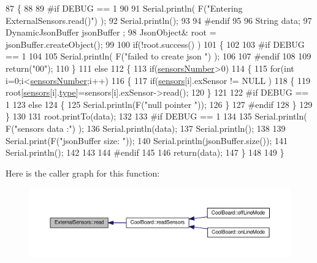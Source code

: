 \begin{DoxyCode}
87 \{
88 
89 \textcolor{preprocessor}{#if DEBUG == 1}
90 
91     Serial.println( F(\textcolor{stringliteral}{"Entering ExternalSensors.read()"}) );
92     Serial.println();
93 
94 \textcolor{preprocessor}{#endif }
95 
96     String data;
97     DynamicJsonBuffer  jsonBuffer ;
98     JsonObject& root = jsonBuffer.createObject();
99 
100     \textcolor{keywordflow}{if}(!root.success() )
101     \{
102  
103 \textcolor{preprocessor}{    #if DEBUG == 1}
104 
105         Serial.println( F(\textcolor{stringliteral}{"failed to create json "}) );
106     
107 \textcolor{preprocessor}{    #endif }
108 
109         \textcolor{keywordflow}{return}(\textcolor{stringliteral}{"00"});
110     \}
111     \textcolor{keywordflow}{else}
112     \{
113         \textcolor{keywordflow}{if}(\hyperlink{classExternalSensors_a58e4fbf9adeae787d92be5fa33043b5d}{sensorsNumber}>0)
114         \{
115             \textcolor{keywordflow}{for}(\textcolor{keywordtype}{int} i=0;i<\hyperlink{classExternalSensors_a58e4fbf9adeae787d92be5fa33043b5d}{sensorsNumber};i++)
116             \{
117                 \textcolor{keywordflow}{if}(\hyperlink{classExternalSensors_a284233f884fcf00154a44740cf1d9e1e}{sensors}[i].exSensor != NULL )
118                 \{
119                     root[\hyperlink{classExternalSensors_a284233f884fcf00154a44740cf1d9e1e}{sensors}[i].\hyperlink{structExternalSensors_1_1sensor_a6acfdb02c742c2110d7bd2b5d9fce9e7}{type}]=sensors[i].exSensor->read();       
120                 \}
121             
122 \textcolor{preprocessor}{            #if DEBUG == 1}
123                 \textcolor{keywordflow}{else}
124                 \{
125                     Serial.println(F(\textcolor{stringliteral}{"null pointer "}));
126                 \}
127 \textcolor{preprocessor}{            #endif  }
128             \}
129         \}   
130         
131         root.printTo(data);
132     
133 \textcolor{preprocessor}{    #if DEBUG == 1}
134 
135         Serial.println( F(\textcolor{stringliteral}{"sensors data :"}) );
136         Serial.println(data);
137         Serial.println();
138 
139         Serial.print(F(\textcolor{stringliteral}{"jsonBuffer size: "}));
140         Serial.println(jsonBuffer.size());
141         Serial.println();
142 
143     
144 \textcolor{preprocessor}{    #endif}
145     
146         \textcolor{keywordflow}{return}(data);
147     \}
148 
149 \}
\end{DoxyCode}
Here is the caller graph for this function\+:
\nopagebreak
\begin{figure}[H]
\begin{center}
\leavevmode
\includegraphics[width=350pt]{classExternalSensors_a53177b81eca3be89508b5511ddcd00fc_icgraph}
\end{center}
\end{figure}


